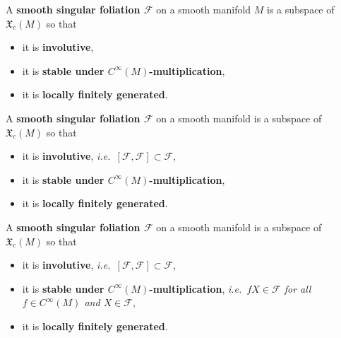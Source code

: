 \documentclass[hyperref={pdfpagelabels=false}]{beamer}
\theoremstyle{plain}
\theoremstyle{remark}
\begin{document}
\begin{frame}
\begin{definition}
A \textbf{smooth singular foliation $\mathcal{F}$} on a smooth manifold $M$ is a subspace of $\mathfrak{X}_c(M)$ so that
\begin{itemize}
	\item it is \textbf{involutive},
	\item it is \textbf{stable under $C^\infty(M)$-multiplication},
	\item it is \textbf{locally finitely generated}.
\end{itemize}
\end{definition}
\end{frame}

\begin{frame}
\begin{definition}
A \textbf{smooth singular foliation $\mathcal{F}$} on a smooth manifold is a subspace of $\mathfrak{X}_c(M)$ so that
\begin{itemize}
	\item it is \textbf{involutive}, \textit{i.e.\ $[\mathcal{F}, \mathcal{F}] \subset \mathcal{F}$},
	\item it is \textbf{stable under $C^\infty(M)$-multiplication},
	\item it is \textbf{locally finitely generated}.
\end{itemize}
\end{definition}
\end{frame}

\begin{frame}
\begin{definition}
A \textbf{smooth singular foliation $\mathcal{F}$} on a smooth manifold is a subspace of $\mathfrak{X}_c(M)$ so that
\begin{itemize}
	\item it is \textbf{involutive}, \textit{i.e.\ $[\mathcal{F}, \mathcal{F}] \subset \mathcal{F}$},
	\item it is \textbf{stable under $C^\infty(M)$-multiplication}, \textit{i.e.\ $fX \in \mathcal{F}$ for all $f \in C^\infty(M)$ and $X \in \mathcal{F}$},
	\item it is \textbf{locally finitely generated}.
\end{itemize}
\end{definition}
\end{frame}
\end{document}
